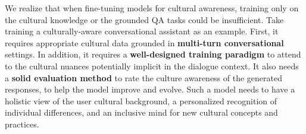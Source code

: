 \documentclass{article} %
\newcommand{\ryan}[1]{\textcolor{magenta}{[#1 --Ryan]}}
\begin{document}
We realize that when fine-tuning models for cultural awareness, training only on the cultural knowledge or the grounded QA tasks could be insufficient. Take training a culturally-aware conversational assistant as an example. First, it requires appropriate cultural data grounded in \textbf{multi-turn conversational} settings. In addition, it requires a \textbf{well-designed training paradigm} to attend to the cultural nuances potentially implicit in the dialogue context. It also needs a \textbf{solid evaluation method} to rate the culture awareness of the generated responses, to help the model improve and evolve. Such a model needs to have a holistic view of the user cultural background, a personalized recognition of individual differences, and an inclusive mind for new cultural concepts and practices.  %



\end{document}
